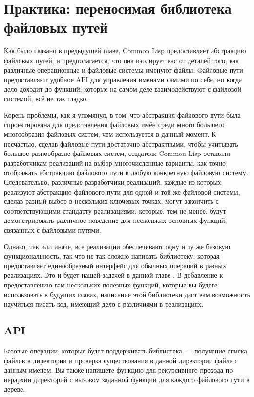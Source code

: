 \chapter{Практика: переносимая библиотека файловых путей}
\label{ch:15}

Как было сказано в предыдущей главе, Common Lisp предоставляет абстракцию файловых путей,
и предполагается, что она изолирует вас от деталей того, как различные операционные и
файловые системы именуют файлы. Файловые пути предоставляют удобное API для управления
именами самими по себе, но когда дело доходит до функций, которые на самом деле
взаимодействуют с файловой системой, всё не так гладко.

Корень проблемы, как я упомянул, в том, что абстракция файлового пути была спроектирована
для представления файловых имён среди много большего многообразия файловых систем, чем
используется в данный момент. К несчастью, сделав файловые пути достаточно абстрактными,
чтобы учитывать большое разнообразие файловых систем, создатели Common Lisp оставили
разработчикам реализаций на выбор многочисленные варианты, как точно отображать абстракцию
файлового пути в любую конкретную файловую систему. Следовательно, различные разработчики
реализаций, каждые из которых реализуют абстракцию файлового пути для одной и той же
файловой системы, сделав разный выбор в нескольких ключевых точках, могут закончить с
соответствующими стандарту реализациями, которые, тем не менее, будут демонстрировать
различное поведение для нескольких основных функций, связанных с файловыми путями.

Однако, так или иначе, все реализации обеспечивают одну и ту же базовую функциональность,
так что не так сложно написать библиотеку, которая предоставляет единообразный интерфейс
для обычных операций в разных реализациях. Это и будет нашей задачей в данной главе . В
добавление к предоставлению вам нескольких полезных функций, которые вы будете
использовать в будущих главах, написание этой библиотеки даст вам возможность научиться
писать код, имеющий дело с различиями в реализациях.

\section{API}

Базовые операции, которые будет поддерживать библиотека~--- получение списка файлов в
директории и проверка существования в данной директории файла с данным именем. Вы также
напишете функцию для рекурсивного прохода по иерархии директорий с вызовом заданной
функции для каждого файлового пути в дереве.

